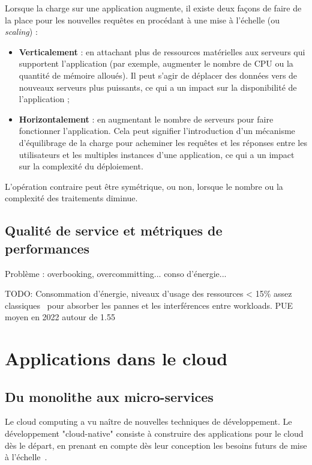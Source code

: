 Lorsque la charge sur une application augmente, il existe deux façons de faire de la place pour les nouvelles requêtes en procédant à une mise à l'échelle (ou \textit{scaling}) :

\begin{itemize}
    \item \textbf{Verticalement} : en attachant plus de ressources matérielles aux serveurs qui supportent l'application (par exemple, augmenter le nombre de CPU ou la quantité de mémoire alloués). Il peut s'agir de déplacer des données vers de nouveaux serveurs plus puissants, ce qui a un impact sur la disponibilité de l'application ;
    \item \textbf{Horizontalement} : en augmentant le nombre de serveurs pour faire fonctionner l'application. Cela peut signifier l'introduction d'un mécanisme d'équilibrage de la charge pour acheminer les requêtes et les réponses entre les utilisateurs et les multiples instances d'une application, ce qui a un impact sur la complexité du déploiement.
\end{itemize}

L'opération contraire peut être symétrique, ou non, lorsque le nombre ou la complexité des traitements diminue.

\subsection{Qualité de service et métriques de performances}

Problème : overbooking, overcommitting... conso d'énergie...

TODO: Consommation d'énergie, niveaux d'usage des ressources < 15\% assez classiques~\cite{vasanWorthTheirWatts2010, vermaLargescaleClusterManagement2015a} pour absorber les pannes et les interférences entre workloads. PUE moyen en 2022 autour de 1.55~\cite{davisUptimeInstituteGlobal2022}

\section{Applications dans le cloud}

\subsection{Du monolithe aux micro-services}

Le cloud computing a vu naître de nouvelles techniques de développement. Le développement "cloud-native" consiste à construire des applications pour le cloud dès le départ, en prenant en compte dès leur conception les besoins futurs de mise à l'échelle~\cite{dragoniMicroservicesHowMake2018, martinfowler2014microservices}.


